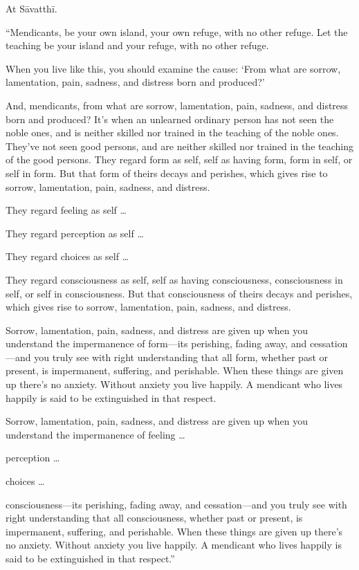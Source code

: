 \documentclass[12pt,openany]{book}%
\begin{document}
At \textsanskrit{Sāvatthī}. 

“Mendicants, be your own island, your own refuge, with no other refuge. Let the teaching be your island and your refuge, with no other refuge. 

When you live like this, you should examine the cause: ‘From what are sorrow, lamentation, pain, sadness, and distress born and produced?’ 

And, mendicants, from what are sorrow, lamentation, pain, sadness, and distress born and produced? It’s when an unlearned ordinary person has not seen the noble ones, and is neither skilled nor trained in the teaching of the noble ones. They’ve not seen good persons, and are neither skilled nor trained in the teaching of the good persons. They regard form as self, self as having form, form in self, or self in form. But that form of theirs decays and perishes, which gives rise to sorrow, lamentation, pain, sadness, and distress. 

They regard feeling as self … 

They regard perception as self … 

They regard choices as self … 

They regard consciousness as self, self as having consciousness, consciousness in self, or self in consciousness. But that consciousness of theirs decays and perishes, which gives rise to sorrow, lamentation, pain, sadness, and distress. 

Sorrow, lamentation, pain, sadness, and distress are given up when you understand the impermanence of form—its perishing, fading away, and cessation—and you truly see with right understanding that all form, whether past or present, is impermanent, suffering, and perishable. When these things are given up there’s no anxiety. Without anxiety you live happily. A mendicant who lives happily is said to be extinguished in that respect. 

Sorrow, lamentation, pain, sadness, and distress are given up when you understand the impermanence of feeling … 

perception … 

choices … 

consciousness—its perishing, fading away, and cessation—and you truly see with right understanding that all consciousness, whether past or present, is impermanent, suffering, and perishable. When these things are given up there’s no anxiety. Without anxiety you live happily. A mendicant who lives happily is said to be extinguished in that respect.” 
\end{document}
